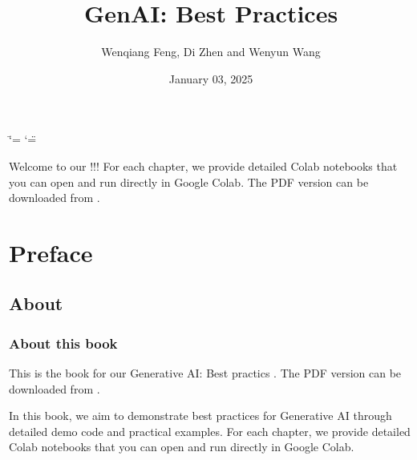 \documentclass[letterpaper,11pt,english]{sphinxmanual}
\title{GenAI: Best Practices}
\date{January 03, 2025}
\author{Wenqiang Feng, Di Zhen and Wenyun Wang}
\begin{document}
\ifdefined\shorthandoff
  \ifnum\catcode`\=\string=\active\shorthandoff{=}\fi
  \ifnum\catcode`\"=\active{}\fi
\fi

\pagestyle{empty}
\sphinxmaketitle
\pagestyle{plain}
\sphinxtableofcontents
\pagestyle{normal}
\label{\detokenize{index::doc}}\label{\detokenize{index:index}}\begin{quote}

\begin{figure}[htbp]
\centering

\noindent{}
\end{figure}
\end{quote}

\sphinxAtStartPar
Welcome to our !!! For each chapter, we provide detailed
Colab notebooks  that you can open and run directly in Google Colab.
The PDF version can be downloaded from .



\sphinxstepscope


\chapter{Preface}
\label{\detokenize{preface:id1}}\label{\detokenize{preface::doc}}

\section{About}
\label{\detokenize{preface:about}}

\subsection{About this book}
\label{\detokenize{preface:about-this-book}}
\sphinxAtStartPar
This is the book for our Generative AI: Best practics .
The PDF version can be downloaded from .

\sphinxAtStartPar
In this book, we aim to demonstrate best practices for Generative AI
through detailed demo code and practical examples. For each chapter, we provide detailed
Colab notebooks  that you can open and run directly in Google Colab.
\end{document}
